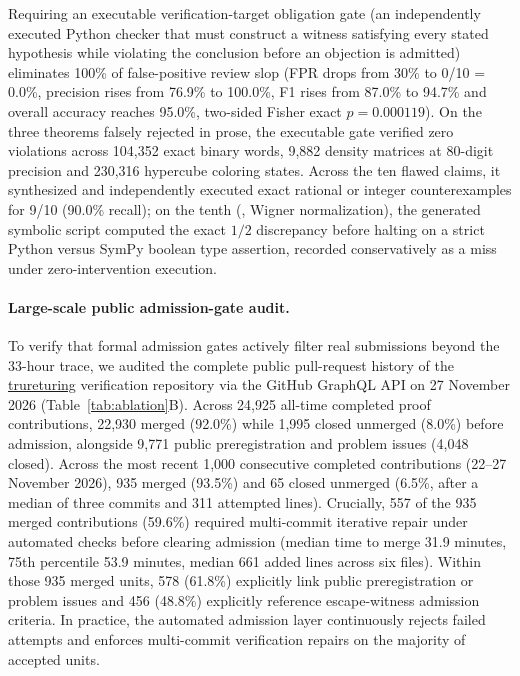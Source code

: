 \documentclass[11pt,a4paper]{article}
\newcommand{\code}[1]{\texttt{\detokenize{#1}}}
\newcommand{\gh}[2]{\href{https://github.com/#1}{#2}}
\begin{document}
Requiring an executable verification-target obligation gate (an independently
executed Python checker that must construct a witness satisfying every stated
hypothesis while violating the conclusion before an objection is admitted)
eliminates 100\% of false-positive review slop (FPR drops from 30\% to 0/10 =
0.0\%, precision rises from 76.9\% to 100.0\%, F1 rises from 87.0\% to 94.7\%
and overall accuracy reaches 95.0\%, two-sided Fisher exact $p=0.000119$). On
the three theorems falsely rejected in prose, the executable gate verified zero
violations across 104,352 exact binary words, 9,882 density matrices at
80-digit precision and 230,316 hypercube coloring states. Across the ten flawed
claims, it synthesized and independently executed exact rational or integer
counterexamples for 9/10 (90.0\% recall); on the tenth (\code{ab_17}, Wigner
normalization), the generated symbolic script computed the exact $1/2$
discrepancy before halting on a strict Python \code{is True} versus SymPy
boolean type assertion, recorded conservatively as a miss under
zero-intervention execution.



\paragraph{Large-scale public admission-gate audit.}
To verify that formal admission gates actively filter real submissions beyond
the 33-hour trace, we audited the complete public pull-request history of the
\gh{the-omega-institute/trureturing}{trureturing} verification repository via
the GitHub GraphQL API on 27 November 2026 (Table~\ref{tab:ablation}B). Across
24,925 all-time completed proof contributions, 22,930 merged (92.0\%) while
1,995 closed unmerged (8.0\%) before admission, alongside 9,771 public
preregistration and problem issues (4,048 closed). Across the most recent
1,000 consecutive completed contributions (22--27 November 2026), 935 merged
(93.5\%) and 65 closed unmerged (6.5\%, after a median of three commits and
311 attempted lines). Crucially, 557 of the 935 merged contributions (59.6\%)
required multi-commit iterative repair under automated checks before clearing
admission (median time to merge 31.9 minutes, 75th percentile 53.9 minutes,
median 661 added lines across six files). Within those 935 merged units, 578
(61.8\%) explicitly link public preregistration or problem issues and 456
(48.8\%) explicitly reference escape-witness admission criteria. In practice, the automated admission layer continuously rejects failed attempts
and enforces multi-commit verification repairs on the majority of accepted
units.
\end{document}
